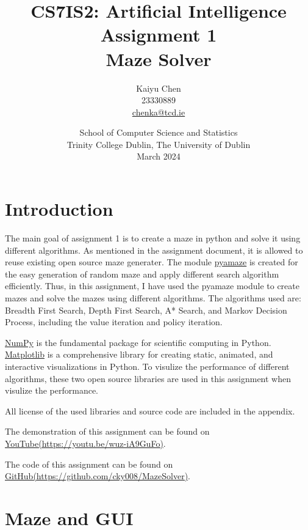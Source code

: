 \documentclass{article}
\title{CS7IS2: Artificial Intelligence Assignment 1\\[1ex] 
Maze Solver}
\author{Kaiyu Chen\\23330889\\\href{mailto:chenka@tcd.ie}{chenka@tcd.ie}}
\date{%
        School of Computer Science and Statistics\\%
        Trinity College Dublin, The University of Dublin\\%
        March 2024
    }
\begin{document}
\maketitle
\renewcommand{\contentsname}{Table of Contents}
\tableofcontents
\newpage

\section{Introduction}
The main goal of assignment 1 is to create a maze in python and solve it using different algorithms. 
As mentioned in the assignment document, it is allowed to reuse existing open source maze generater. 
The module \href{https://github.com/MAN1986/pyamaze}{pyamaze} is created for the easy generation of random maze and apply different search algorithm efficiently\cite{pyamaz_github}.
Thus, in this assignment, I have used the pyamaze module to create mazes and solve the mazes using different algorithms. 
The algorithms used are: Breadth First Search, Depth First Search, A* Search, and Markov Decision Process, including the value iteration and policy iteration.

\href{hhttps://github.com/numpy/numpy}{NumPy} is the fundamental package for scientific computing in Python\cite{numpy_intro}. 
\href{https://github.com/matplotlib/matplotlib}{Matplotlib} is a comprehensive library for creating static, animated, and interactive visualizations in Python\cite{matplotlib_intro}.
To visulize the performance of different algorithms, these two open source libraries are used in this assignment when visulize the performance.

All license of the used libraries and source code are included in the appendix.

The demonstration of this assignment can be found on \href{https://youtu.be/wuz-iA9GuFo}{YouTube(https://youtu.be/wuz-iA9GuFo)}.

The code of this assignment can be found on \href{https://github.com/cky008/MazeSolver}{GitHub(https://github.com/cky008/MazeSolver)}.

\section{Maze and GUI}
\end{document}
